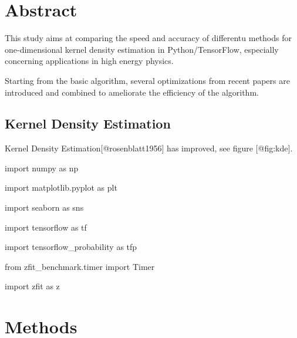 \documentclass[
  12pt,
  english,
  a4paper,
,tablecaptionabove
]{scrartcl}
\newenvironment{Shaded}{\begin{snugshade}}{\end{snugshade}}
\newcommand{\ImportTok}[1]{#1}
\newcommand{\NormalTok}[1]{#1}
\begin{document}



{
\setcounter{tocdepth}{2}
\tableofcontents
\newpage
}
\hypertarget{abstract}{%
\section*{Abstract}\label{abstract}}

This study aims at comparing the speed and accuracy of differentu methods for one-dimensional kernel density estimation in Python/TensorFlow, especially concerning applications in high energy physics.

Starting from the basic algorithm, several optimizations from recent papers are introduced and combined to ameliorate the efficiency of the algorithm.

\hypertarget{kernel-density-estimation}{%
\subsection{Kernel Density Estimation}\label{kernel-density-estimation}}

Kernel Density Estimation{[}@rosenblatt1956{]} has improved, see figure {[}@fig:kde{]}.

\begin{Shaded}
\begin{Highlighting}[]
\ImportTok{import}\NormalTok{ numpy }\ImportTok{as}\NormalTok{ np}

\ImportTok{import}\NormalTok{ matplotlib.pyplot }\ImportTok{as}\NormalTok{ plt}

\ImportTok{import}\NormalTok{ seaborn }\ImportTok{as}\NormalTok{ sns}

\ImportTok{import}\NormalTok{ tensorflow }\ImportTok{as}\NormalTok{ tf}

\ImportTok{import}\NormalTok{ tensorflow_probability }\ImportTok{as}\NormalTok{ tfp}

\ImportTok{from}\NormalTok{ zfit_benchmark.timer }\ImportTok{import}\NormalTok{ Timer}

\ImportTok{import}\NormalTok{ zfit }\ImportTok{as}\NormalTok{ z}
\end{Highlighting}
\end{Shaded}

\hypertarget{methods}{%
\section{Methods}\label{methods}}
\end{document}
